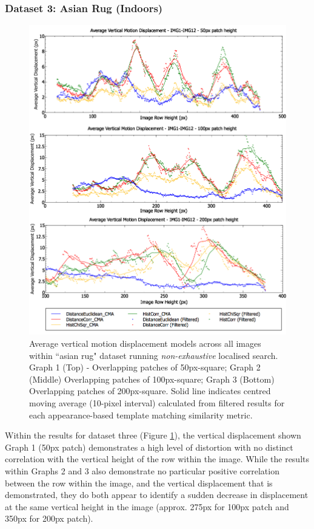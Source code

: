 \clearpage
\subsubsection{Dataset 3: Asian Rug (Indoors)}

\begin{figure}[ht!]
\centering
\includegraphics[scale=0.4]{images/results/ex1_results_inside_10cm}
\caption{Average vertical motion displacement models across all images within ``asian rug" dataset running \textit{non-exhaustive} localised search. Graph 1 (Top) - Overlapping patches of 50px-square; Graph 2 (Middle) Overlapping patches of 100px-square; Graph 3 (Bottom) Overlapping patches of 200px-square. Solid line indicates centred moving average (10-pixel interval) calculated from filtered results for each appearance-based template matching similarity metric.}
\label{fig:ex1_1_3}
\end{figure}

Within the results for dataset three (Figure \ref{fig:ex1_1_3}), the vertical displacement shown Graph 1 (50px patch) demonstrates a high level of distortion with no distinct correlation with the vertical height of the row within the image. While the results within Graphs 2 and 3 also demonstrate no particular positive correlation between the row within the image, and the vertical displacement that is demonstrated, they do both appear to identify a sudden decrease in displacement at the same vertical height in the image (approx. 275px for 100px patch and 350px for 200px patch).

